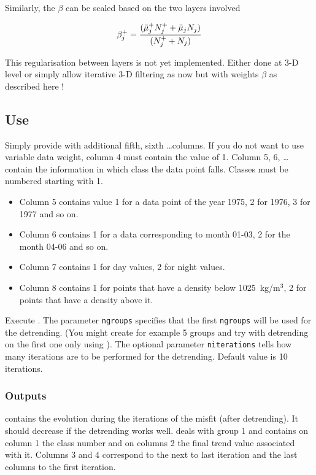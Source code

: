 Similarly, the $\beta$ can be scaled based on the two layers involved

\begin{equation}
\beta^+_j = { (\bar{\mu}^+_j N_j^+ + \bar{\mu}_j N_j) \over (N_j^++N_j) }
\end{equation}

This regularisation between layers is not yet implemented. Either done at 3-D level or simply allow iterative 3-D filtering as now but with weights $\beta$ as described here !

\subsection{Use}

Simply provide  with additional fifth, sixth \ldots columns. If you do not want to use variable data weight, column 4 must contain the value of 1. Column 5, 6, \ldots contain the information in which class the data point falls. Classes must be numbered starting with 1.

\example
\begin{itemize}
\item
Column 5 contains value 1 for a data point of the year 1975, 2 for 1976, 3 for 1977 and so on.
\item
Column 6 contains 1 for a data corresponding to month 01-03, 2 for the month 04-06 and so on.
\item
Column 7 contains 1 for day values, 2 for night values.
\item
Column 8 contains 1 for points that have a density below 1025~kg/m$^3$, 2 for points that have a density above it.
\end{itemize}

Execute . The parameter {\tt ngroups} specifies that the first {\tt ngroups} will be used for the detrending.
(You might create for example 5 groups and try with detrending on the first one only using ). The optional parameter {\tt niterations} tells how many iterations are to be performed for the detrending. Default value is 10 iterations.

\subsubsection{Outputs}
 contains the evolution during the iterations of the misfit (after detrending). It should decrease if the detrending works well.  
 deals with group 1 and contains on column 1 the class number and on columns 2 the final trend value associated with it. Columns 3 and 4 correspond to the next to last iteration and the last columns to the first iteration.

